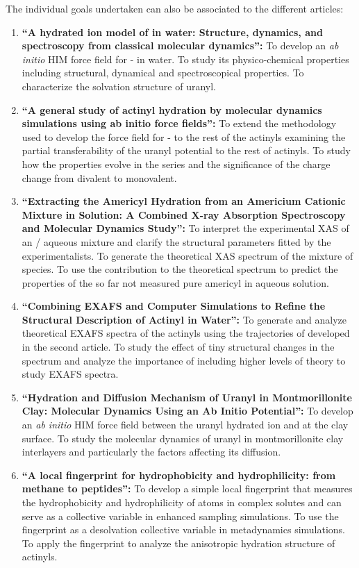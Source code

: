 The individual goals undertaken can also be associated to the different articles:
\begin{enumerate}
 \item \textbf{``A hydrated ion model of  in water: Structure, dynamics, and 
spectroscopy from classical molecular dynamics'':}\newline
To develop an \textit{ab initio} HIM force field for - in water. To 
study 
its physico-chemical properties including structural, dynamical and spectroscopical 
properties. To characterize the solvation structure of uranyl.
 \item \textbf{``A general study of actinyl hydration by molecular dynamics simulations using 
ab initio force fields'':}\newline
To extend the methodology used to develop the force field for - to 
the 
rest of the actinyls examining the partial transferability of the uranyl potential to the rest 
of 
actinyls. To 
study how the properties evolve in the series and the significance of the charge change
from divalent to monovalent.
 \item \textbf{``Extracting the Americyl Hydration from an Americium Cationic Mixture in 
Solution: A Combined X-ray Absorption Spectroscopy and Mo\-le\-cu\-lar Dynamics 
Study'':}\newline
To interpret the experimental XAS of an / aqueous mixture and clarify 
the structural parameters fitted by the experimentalists. To generate the theoretical 
XAS spectrum of the mixture of species. To use the  contribution to the  
theoretical 
spectrum to predict the properties of the so far not measured pure americyl in aqueous solution. 
 \item \textbf{``Combining EXAFS and Computer Simulations to
Refine the Structural Description of Actinyl in Water'':} To generate and analyze theoretical EXAFS 
spectra of the actinyls using the trajectories of developed in the second article. To study the 
effect of tiny 
structural changes in the spectrum and analyze the importance of including 
higher levels of 
theory to study EXAFS spectra.
 \item \textbf{``Hydration and Diffusion Mechanism of Uranyl in Montmorillonite Clay: 
Molecular Dynamics Using an Ab Initio Potential'':}\newline
To develop an \textit{ab initio} HIM force field between the uranyl hydrated  ion  and at 
the clay
surface. To study the molecular dynamics of uranyl in montmorillonite clay interlayers and 
particularly the factors affecting its diffusion.
 \item \textbf{``A local fingerprint for hydrophobicity and hydrophilicity: from 
me\-tha\-ne to 
peptides'':}\newline
To develop a simple local fingerprint that measures the hydrophobicity and hydrophilicity of 
atoms in complex solutes and can serve as a collective variable in enhanced sampling 
simulations. To use the fingerprint as a desolvation collective variable in  metadynamics 
simulations. To apply the fingerprint to analyze the anisotropic hydration structure of actinyls.
\end{enumerate}

